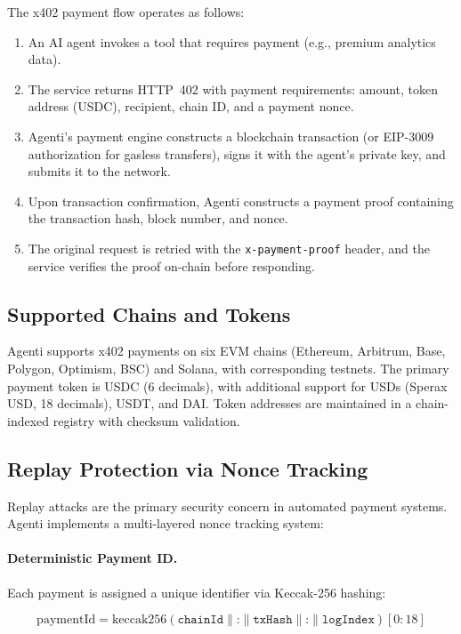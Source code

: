 \documentclass[11pt]{article}
\begin{document}
The x402 payment flow operates as follows:

\begin{enumerate}[leftmargin=*]
  \item An AI agent invokes a tool that requires payment (e.g., premium analytics data).
  \item The service returns HTTP~402 with payment requirements: amount, token address (USDC), recipient, chain ID, and a payment nonce.
  \item Agenti's payment engine constructs a blockchain transaction (or EIP-3009 authorization for gasless transfers), signs it with the agent's private key, and submits it to the network.
  \item Upon transaction confirmation, Agenti constructs a payment proof containing the transaction hash, block number, and nonce.
  \item The original request is retried with the \texttt{x-payment-proof} header, and the service verifies the proof on-chain before responding.
\end{enumerate}

\subsection{Supported Chains and Tokens}

Agenti supports x402 payments on six EVM chains (Ethereum, Arbitrum, Base, Polygon, Optimism, BSC) and Solana, with corresponding testnets. The primary payment token is USDC (6 decimals), with additional support for USDs (Sperax USD, 18 decimals), USDT, and DAI. Token addresses are maintained in a chain-indexed registry with checksum validation.

\subsection{Replay Protection via Nonce Tracking}
\label{sec:nonce}

Replay attacks are the primary security concern in automated payment systems. Agenti implements a multi-layered nonce tracking system:

\paragraph{Deterministic Payment ID.} Each payment is assigned a unique identifier via Keccak-256 hashing:

$$\text{paymentId} = \text{keccak256}(\texttt{chainId} \| \texttt{:} \| \texttt{txHash} \| \texttt{:} \| \texttt{logIndex})[0{:}18]$$
\end{document}
